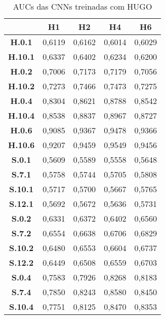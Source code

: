 \begin{apendicesenv}
\begin{table}[!h]
\centering
\caption{AUCs das CNNs treinadas com HUGO}
\begin{tabular}{|c|c|c|c|c|}
\hline
\textbf{}       & \textbf{H1} & \textbf{H2} & \textbf{H4} & \textbf{H6} \\ \hline
\textbf{H.0.1}  & 0,6119      & 0,6162      & 0,6014      & 0,6029      \\ \hline
\textbf{H.10.1} & 0,6337      & 0,6402      & 0,6234      & 0,6200      \\ \hline
\textbf{H.0.2}  & 0,7006      & 0,7173      & 0,7179      & 0,7056      \\ \hline
\textbf{H.10.2} & 0,7273      & 0,7466      & 0,7473      & 0,7275      \\ \hline
\textbf{H.0.4}  & 0,8304      & 0,8621      & 0,8788      & 0,8542      \\ \hline
\textbf{H.10.4} & 0,8538      & 0,8837      & 0,8967      & 0,8727      \\ \hline
\textbf{H.0.6}  & 0,9085      & 0,9367      & 0,9478      & 0,9366      \\ \hline
\textbf{H.10.6} & 0,9207      & 0,9459      & 0,9549      & 0,9456      \\ \hline
\textbf{S.0.1}  & 0,5609      & 0,5589      & 0,5558      & 0,5648      \\ \hline
\textbf{S.7.1}  & 0,5758      & 0,5744      & 0,5705      & 0,5808      \\ \hline
\textbf{S.10.1} & 0,5717      & 0,5700      & 0,5667      & 0,5765      \\ \hline
\textbf{S.12.1} & 0,5692      & 0,5672      & 0,5636      & 0,5731      \\ \hline
\textbf{S.0.2}  & 0,6331      & 0,6372      & 0,6402      & 0,6560      \\ \hline
\textbf{S.7.2}  & 0,6554      & 0,6638      & 0,6706      & 0,6829      \\ \hline
\textbf{S.10.2} & 0,6480      & 0,6553      & 0,6604      & 0,6737      \\ \hline
\textbf{S.12.2} & 0,6449      & 0,6508      & 0,6559      & 0,6703      \\ \hline
\textbf{S.0.4}  & 0,7583      & 0,7926      & 0,8268      & 0,8183      \\ \hline
\textbf{S.7.4}  & 0,7850      & 0,8243      & 0,8580      & 0,8450      \\ \hline
\textbf{S.10.4} & 0,7751      & 0,8125      & 0,8470      & 0,8353      \\ \hline

\end{tabular}
\end{table}
\end{apendicesenv}
